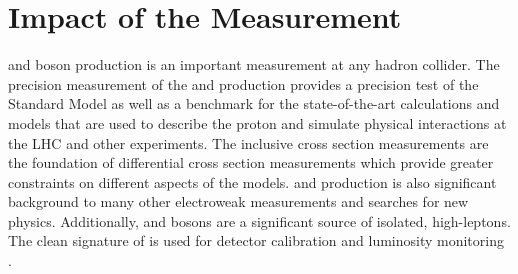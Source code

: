 



\section{Impact of the Measurement}
\W and \Z boson production is an important measurement at any hadron collider. The precision measurement of the \W and \Z  production provides a precision test of the Standard Model as well as a benchmark for the state-of-the-art calculations and models that are used to describe the proton and simulate physical interactions at the LHC and other experiments. The inclusive cross section measurements are the foundation of differential cross section measurements which provide greater constraints on different aspects of the models.  \W and \Z production is also significant background to many other electroweak measurements and searches for new physics.
Additionally, \W and \Z bosons are a significant source of isolated, high-\pt leptons. The clean signature of \zll is used for detector calibration and luminosity monitoring \cite{xinmei}.
